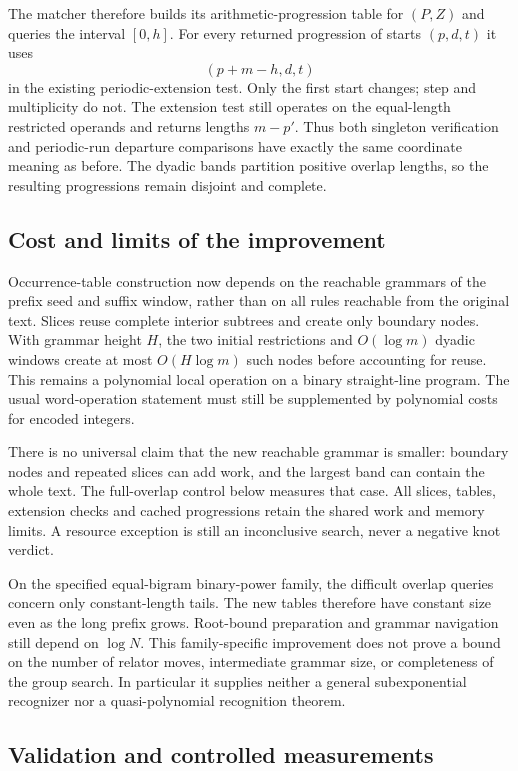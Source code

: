 The matcher therefore builds its arithmetic-progression table for $(P,Z)$
and queries the interval $[0,h]$. For every returned progression of starts
$(p,d,t)$ it uses
\[
 (p+m-h,d,t)
\]
in the existing periodic-extension test. Only the first start changes;
step and multiplicity do not. The extension test still operates on the
equal-length restricted operands and returns lengths $m-p'$. Thus both
singleton verification and periodic-run departure comparisons have exactly
the same coordinate meaning as before. The dyadic bands partition positive
overlap lengths, so the resulting progressions remain disjoint and complete.

\subsection{Cost and limits of the improvement}

Occurrence-table construction now depends on the reachable grammars of
the prefix seed and suffix window, rather than on all rules reachable
from the original text. Slices reuse complete interior subtrees and create
only boundary nodes. With grammar height $H$, the two initial restrictions
and $O(\log m)$ dyadic windows create at most $O(H\log m)$ such nodes
before accounting for reuse. This remains a polynomial local operation
on a binary straight-line program. The usual word-operation statement
must still be supplemented by polynomial costs for encoded integers.

There is no universal claim that the new reachable grammar is smaller:
boundary nodes and repeated slices can add work, and the largest band
can contain the whole text. The full-overlap control below measures that
case. All slices, tables, extension checks and cached progressions retain
the shared work and memory limits. A resource exception is still an
inconclusive search, never a negative knot verdict.

On the specified equal-bigram binary-power family, the difficult overlap
queries concern only constant-length tails. The new tables therefore
have constant size even as the long prefix grows. Root-bound preparation
and grammar navigation still depend on $\log N$. This family-specific
improvement does not prove a bound on the number of relator moves,
intermediate grammar size, or completeness of the group search. In
particular it supplies neither a general subexponential recognizer nor
a quasi-polynomial recognition theorem.

\subsection{Validation and controlled measurements}

